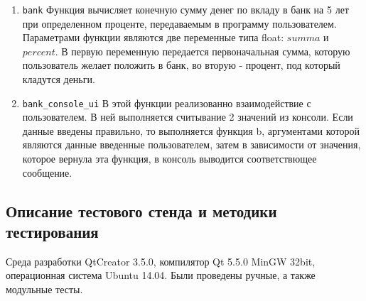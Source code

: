 \documentclass[12pt,a4paper]{report}
\begin{document}
	\begin{enumerate}
		\item \verb+bank+	
		 Функция вычисляет конечную сумму денег по вкладу в банк на 5 лет при определенном проценте, передаваемым в программу пользователем.
		 Параметрами функции являются две переменные типа float: $summa$ и $percent$. В первую переменную передается первоначальная сумма, которую пользователь желает положить в банк, во вторую - процент, под который кладутся деньги.	 
		\item \verb+bank_console_ui+	 
		 В этой функции реализованно взаимодействие с пользователем. В ней выполняется считывание 2 значений из консоли. Если данные введены правильно, то выполняется функция b, аргументами которой являются данные введенные пользователем, затем в зависимости от значения, которое вернула эта функция, в  консоль выводится соответствющее сообщение. 		
	\end{enumerate}
	
\subsection{Описание тестового стенда и методики тестирования}
\hspace{\parindent}
Среда разработки QtCreator 3.5.0, компилятор Qt 5.5.0 MinGW 32bit, операционная система Ubuntu 14.04. Были проведены ручные, а также модульные тесты.
\end{document}
